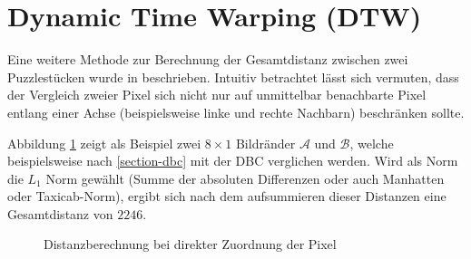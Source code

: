 \documentclass{whswinvcbook}
\begin{document}
\section{Dynamic Time Warping (DTW)}
Eine weitere Methode zur Berechnung der Gesamtdistanz zwischen zwei Puzzlestücken wurde in \cite{hungarian} beschrieben. Intuitiv betrachtet lässt sich vermuten, dass der Vergleich zweier Pixel sich nicht nur auf unmittelbar benachbarte Pixel entlang einer Achse (beispielsweise linke und rechte Nachbarn) beschränken sollte.

Abbildung \ref{fig-dtw-ex} zeigt als Beispiel zwei $8\times1$ Bildränder $\mathcal{A}$ und $\mathcal{B}$, welche beispielsweise nach \ref{section-dbc} mit der DBC verglichen werden. Wird als Norm die $L_1$ Norm gewählt (Summe der absoluten Differenzen oder auch Manhatten oder Taxicab-Norm), ergibt sich nach dem aufsummieren dieser Distanzen eine Gesamtdistanz von $2246$.
\begin{figure}[H]
    \centering
    \quad\quad\quad\quad
    \caption{Distanzberechnung bei direkter Zuordnung der Pixel}
    \label{fig-dtw-ex}
\end{figure}
\end{document}

